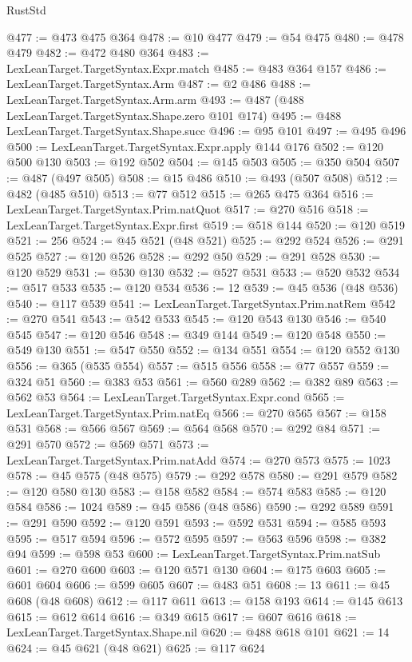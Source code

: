 \begin{lexlean}{RustStd}
\begin{coremodule}
@477 := @473 @475 @364
@478 := @10 @477
@479 := @54 @475
@480 := @478 @479
@482 := @472 @480 @364
@483 := LexLeanTarget.TargetSyntax.Expr.match
@485 := @483 @364 @157
@486 := LexLeanTarget.TargetSyntax.Arm
@487 := @2 @486
@488 := LexLeanTarget.TargetSyntax.Arm.arm
@493 := @487 (@488 LexLeanTarget.TargetSyntax.Shape.zero @101 @174)
@495 := @488 LexLeanTarget.TargetSyntax.Shape.succ
@496 := @95 @101
@497 := @495 @496
@500 := LexLeanTarget.TargetSyntax.Expr.apply @144 @176
@502 := @120 @500 @130
@503 := @192 @502
@504 := @145 @503
@505 := @350 @504
@507 := @487 (@497 @505)
@508 := @15 @486
@510 := @493 (@507 @508)
@512 := @482 (@485 @510)
@513 := @77 @512
@515 := @265 @475 @364
@516 := LexLeanTarget.TargetSyntax.Prim.natQuot
@517 := @270 @516
@518 := LexLeanTarget.TargetSyntax.Expr.first
@519 := @518 @144
@520 := @120 @519
@521 := 256
@524 := @45 @521 (@48 @521)
@525 := @292 @524
@526 := @291 @525
@527 := @120 @526
@528 := @292 @50
@529 := @291 @528
@530 := @120 @529
@531 := @530 @130
@532 := @527 @531
@533 := @520 @532
@534 := @517 @533
@535 := @120 @534
@536 := 12
@539 := @45 @536 (@48 @536)
@540 := @117 @539
@541 := LexLeanTarget.TargetSyntax.Prim.natRem
@542 := @270 @541
@543 := @542 @533
@545 := @120 @543 @130
@546 := @540 @545
@547 := @120 @546
@548 := @349 @144
@549 := @120 @548
@550 := @549 @130
@551 := @547 @550
@552 := @134 @551
@554 := @120 @552 @130
@556 := @365 (@535 @554)
@557 := @515 @556
@558 := @77 @557
@559 := @324 @51
@560 := @383 @53
@561 := @560 @289
@562 := @382 @89
@563 := @562 @53
@564 := LexLeanTarget.TargetSyntax.Expr.cond
@565 := LexLeanTarget.TargetSyntax.Prim.natEq
@566 := @270 @565
@567 := @158 @531
@568 := @566 @567
@569 := @564 @568
@570 := @292 @84
@571 := @291 @570
@572 := @569 @571
@573 := LexLeanTarget.TargetSyntax.Prim.natAdd
@574 := @270 @573
@575 := 1023
@578 := @45 @575 (@48 @575)
@579 := @292 @578
@580 := @291 @579
@582 := @120 @580 @130
@583 := @158 @582
@584 := @574 @583
@585 := @120 @584
@586 := 1024
@589 := @45 @586 (@48 @586)
@590 := @292 @589
@591 := @291 @590
@592 := @120 @591
@593 := @592 @531
@594 := @585 @593
@595 := @517 @594
@596 := @572 @595
@597 := @563 @596
@598 := @382 @94
@599 := @598 @53
@600 := LexLeanTarget.TargetSyntax.Prim.natSub
@601 := @270 @600
@603 := @120 @571 @130
@604 := @175 @603
@605 := @601 @604
@606 := @599 @605
@607 := @483 @51
@608 := 13
@611 := @45 @608 (@48 @608)
@612 := @117 @611
@613 := @158 @193
@614 := @145 @613
@615 := @612 @614
@616 := @349 @615
@617 := @607 @616
@618 := LexLeanTarget.TargetSyntax.Shape.nil
@620 := @488 @618 @101
@621 := 14
@624 := @45 @621 (@48 @621)
@625 := @117 @624

\end{coremodule}
\end{lexlean}
